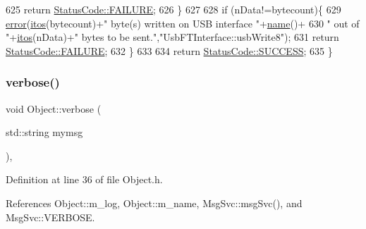 \begin{DoxyCode}
625     \textcolor{keywordflow}{return} \hyperlink{classStatusCode_a6f565cbeadc76d14c72f047e5e85eb4ba3da73d4c469762eb9d3c960368252b26}{StatusCode::FAILURE};
626   \}
627 
628   \textcolor{keywordflow}{if} (nData!=bytecount)\{
629     \hyperlink{classObject_a204a95f57818c0f811933917a30eff45}{error}(\hyperlink{Tools_8h_af330027dbdafb9a30768b3613c553e60}{itos}(bytecount)+\textcolor{stringliteral}{" byte(s) written on USB interface "}+\hyperlink{classObject_a300f4c05dd468c7bb8b3c968868443c1}{name}()+
630             \textcolor{stringliteral}{" out of "}+\hyperlink{Tools_8h_af330027dbdafb9a30768b3613c553e60}{itos}(nData)+\textcolor{stringliteral}{" bytes to be sent."},\textcolor{stringliteral}{"UsbFTInterface::usbWrite8"});
631     \textcolor{keywordflow}{return} \hyperlink{classStatusCode_a6f565cbeadc76d14c72f047e5e85eb4ba3da73d4c469762eb9d3c960368252b26}{StatusCode::FAILURE};    
632   \}
633 
634   \textcolor{keywordflow}{return} \hyperlink{classStatusCode_a6f565cbeadc76d14c72f047e5e85eb4badd0da38d3ba0d922efd1f4619bc37ad8}{StatusCode::SUCCESS};  
635 \}
\end{DoxyCode}
\mbox{\label{classObject_a83d2db2df682907ea1115ad721c1c4a1}} 
\subsubsection{\texorpdfstring{verbose()}{verbose()}\hspace{0.1cm}{\footnotesize\ttfamily [1/2]}}
{\footnotesize\ttfamily void Object\+::verbose (\begin{DoxyParamCaption}\item[{std\+::string}]{mymsg }\end{DoxyParamCaption})\hspace{0.3cm}{\ttfamily [inline]}, {\ttfamily [inherited]}}



Definition at line 36 of file Object.\+h.



References Object\+::m\+\_\+log, Object\+::m\+\_\+name, Msg\+Svc\+::msg\+Svc(), and Msg\+Svc\+::\+V\+E\+R\+B\+O\+SE.




